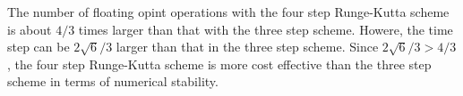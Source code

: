 The number of floating opint operations with the four step Runge-Kutta scheme is about $4/3$ times larger than that with the three step scheme.
Howere, the time step can be $2\sqrt{6}/3$ larger than that in the three step scheme.
Since $2\sqrt{6}/3 > 4/3$, the four step Runge-Kutta scheme is more cost effective than the three step scheme in terms of numerical stability.
